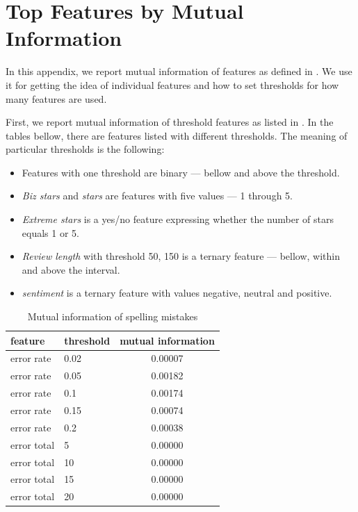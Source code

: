 \chapter{Top Features by Mutual Information}\label{app:mi}

In this appendix, we report mutual information of features as defined in .
We use it for getting the idea of individual features and how to set thresholds for how many features
are used.

First, we report mutual information of threshold features as listed in .
In the tables bellow, there are features listed with different thresholds.
The meaning of particular thresholds is the following:

\begin{itemize}
\item Features with one threshold are binary --- bellow and above the threshold.
\item \textit{Biz stars} and \textit{stars} are features with five values --- 1 through 5.
\item \textit{Extreme stars} is a yes/no feature expressing whether the number of stars equals 1 or 5.
\item \textit{Review length} with threshold 50, 150 is a ternary feature --- bellow, within and above the interval.
\item \textit{sentiment} is a ternary feature with values negative, neutral and positive.
\end{itemize}



\begin{table}[h!]

\centering
\begin{tabular}{llS[table-format=3.2]}
\toprule
\textbf{feature} & \textbf{threshold} & \textbf{mutual information} \\
\midrule
error rate & 0.02 & 0.00007 \\
error rate & 0.05 & 0.00182 \\
error rate & 0.1 & 0.00174 \\
error rate & 0.15 & 0.00074 \\
error rate & 0.2 & 0.00038 \\
error total & 5 & 0.00000 \\
error total & 10 & 0.00000 \\
error total & 15 & 0.00000 \\
error total & 20 & 0.00000 \\
\bottomrule
\end{tabular}

\caption{Mutual information of spelling mistakes}\label{tab:mi_errors}
\end{table}

